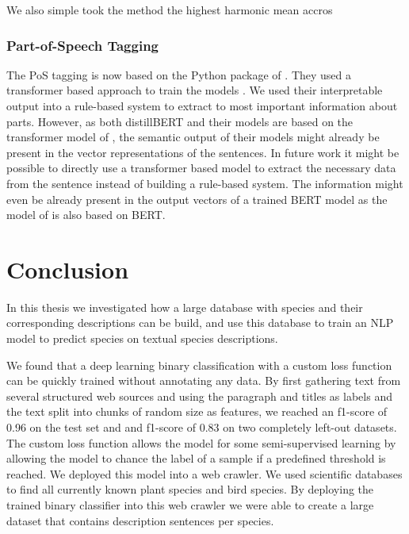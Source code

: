 \documentclass[a4paper, 12pt, oneside]{book} %
\begin{document}
We also simple took the method the highest harmonic mean accros 


\subsubsection{Part-of-Speech Tagging}
The PoS tagging is now based on the Python package of \textcite{honnibal_spacy_2020}.
They used a transformer based approach to train the models \autocite{wolf_huggingfaces_2020, vaswani_attention_2017}.
We used their interpretable output into a rule-based system to extract to most important information about parts.
However, as both distillBERT and their models are based on the transformer model of \textcite{vaswani_attention_2017}, the semantic output of their models might already be present in the vector representations of the sentences.
In future work it might be possible to directly use a transformer based model to extract the necessary data from the sentence instead of building a rule-based system.
The information might even be already present in the output vectors of a trained BERT model as the model of \textcite{wolf_huggingfaces_2020} is also based on BERT.





\newpage
\section{Conclusion} \label{par:conclusion}
In this thesis we investigated how a large database with species and their corresponding descriptions can be build, and use this database to train an NLP model to predict species on textual species descriptions.

We found that a deep learning binary classification with a custom loss function can be quickly trained without annotating any data.
By first gathering text from several structured web sources and using the paragraph and titles as labels and the text split into chunks of random size as features, we reached an f1-score of 0.96 on the test set and and f1-score of 0.83 on two completely left-out datasets.
The custom loss function allows the model for some semi-supervised learning by allowing the model to chance the label of a sample if a predefined threshold is reached.
We deployed this model into a web crawler.
We used scientific databases to find all currently known plant species and bird species.
By deploying the trained binary classifier into this web crawler we were able to create a large dataset that contains description sentences per species.
\end{document}
